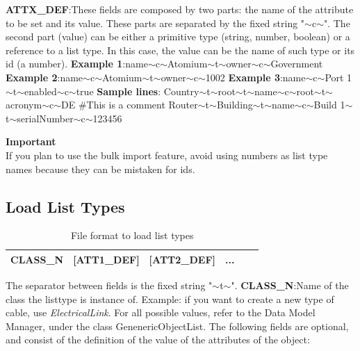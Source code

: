\documentclass[a4paper]{article}
\begin{document}
				\textbf{ATTX\_DEF}:These fields are composed by two parts: the name of the attribute to be set and its value. These parts are separated by the fixed string "$\sim$c$\sim$". The second part (value) can be either a primitive type (string, number, boolean) or a reference to a list type. In this case, the value can be the name of such type or its id (a number).
				\newline 
				\newline 
				\textbf{Example 1}:name$\sim$c$\sim$Atomium$\sim$t$\sim$owner$\sim$c$\sim$Government
				\newline 
				\textbf{Example 2}:name$\sim$c$\sim$Atomium$\sim$t$\sim$owner$\sim$c$\sim$1002
				\newline 
				\textbf{Example 3}:name$\sim$c$\sim$Port 1$\sim$t$\sim$enabled$\sim$c$\sim$true
				\newline 
				\newline
				\textbf{Sample lines}: Country$\sim$t$\sim$root$\sim$t$\sim$name$\sim$c$\sim$root$\sim$t$\sim$acronym$\sim$c$\sim$DE
				\newline 
				\#This is a comment 
				\newline 
				Router$\sim$t$\sim$Building$\sim$t$\sim$name$\sim$c$\sim$Build 1$\sim$t$\sim$serialNumber$\sim$c$\sim$123456			
				\begin{framed} {\large \textbf{Important}}\\
					If you plan to use the bulk import feature, avoid using numbers as list type names because they can be mistaken for ids.	
				\end{framed}
			\subsection{Load List Types}\label{sec:bi_load_list_types}	
				\begin{table}[!h]
					\centering
					\begin{tabular}{|l|l|l|l|l|l|}
						\hline
						CLASS\_N& [ATT1\_DEF] & [ATT2\_DEF] & ...  \\ \hline
					\end{tabular}
					\caption{File format to load list types}
					\label{tab:file_format_list_types}
				\end{table}
				The separator between fields is the fixed string "$\sim$t$\sim$".	
				\textbf{CLASS\_N}:Name of the class the listtype is instance of. Example: if you want to create a new type of cable, use \textit{ElectricalLink}. For all possible values, refer to the Data Model Manager, under the class GenenericObjectList.
				\newline
				The following fields are optional, and consist of the definition of the value of the attributes 
				of the object:
				
\end{document}
